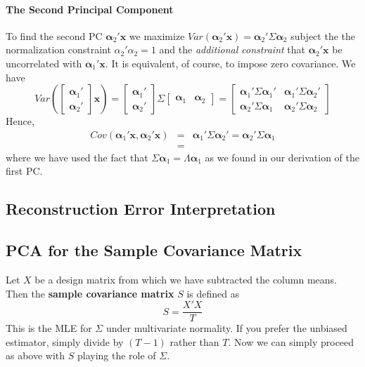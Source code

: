 \documentclass[12pt]{article}
\theoremstyle{definition}
\begin{document}
\paragraph{The Second Principal Component}
To find the second PC $\boldsymbol{\alpha}_2' \mathbf{x}$ we maximize $Var(\boldsymbol{\alpha}_2' \mathbf{x}) =\boldsymbol{\alpha}_2' \Sigma \boldsymbol{\alpha}_2$ subject the the normalization constraint $\alpha_2' \alpha_2 = 1$ and the \emph{additional constraint} that $\boldsymbol{\alpha}_2' \mathbf{x}$ be uncorrelated with $\boldsymbol{\alpha}_1' \mathbf{x}$. It is equivalent, of course, to impose zero covariance. We have
$$Var\left(\left[\begin{array}
	{cc} \boldsymbol{\alpha}_1' \\ \boldsymbol{\alpha}_2'
\end{array} \right] \textbf{x}\right) = \left[\begin{array}
	{c} \boldsymbol{\alpha}_1' \\ \boldsymbol{\alpha}_2'
\end{array} \right] \Sigma \left[\begin{array}
	{cc} \boldsymbol{\alpha}_1 & \boldsymbol{\alpha}_2
\end{array}\right] = \left[ \begin{array}
	{cc} \boldsymbol{\alpha}_1' \Sigma \boldsymbol{\alpha}_1' & \boldsymbol{\alpha}_1'\Sigma \boldsymbol{\alpha}_2'\\
	\boldsymbol{\alpha}_2' \Sigma \boldsymbol{\alpha}_1 & \boldsymbol{\alpha}_2' \Sigma \boldsymbol{\alpha}_2
\end{array}\right]$$
Hence,
\begin{eqnarray*}
	Cov\left(\boldsymbol{\alpha}_1' \mathbf{x}, \boldsymbol{\alpha}_2' \mathbf{x} \right) &=& \boldsymbol{\alpha}_1'\Sigma \boldsymbol{\alpha}_2' = \boldsymbol{\alpha}_2' \Sigma \boldsymbol{\alpha}_1 \\
		&=&
\end{eqnarray*}
where we have used the fact that $\Sigma \boldsymbol{\alpha}_1 = \Lambda \boldsymbol{\alpha}_1$ as we found in our derivation of the first PC.



\subsection{Reconstruction Error Interpretation}

\subsection{PCA for the Sample Covariance Matrix}
Let $X$ be a design matrix from which we have subtracted the column means. Then the \textbf{sample covariance matrix} $S$ is defined as
	$$S = \frac{X'X}{T}$$
This is the MLE for $\Sigma$ under multivariate normality. If you prefer the unbiased estimator, simply divide by $(T-1)$ rather than $T$. Now we can simply proceed as above with $S$ playing the role of $\Sigma$. 
\end{document}
